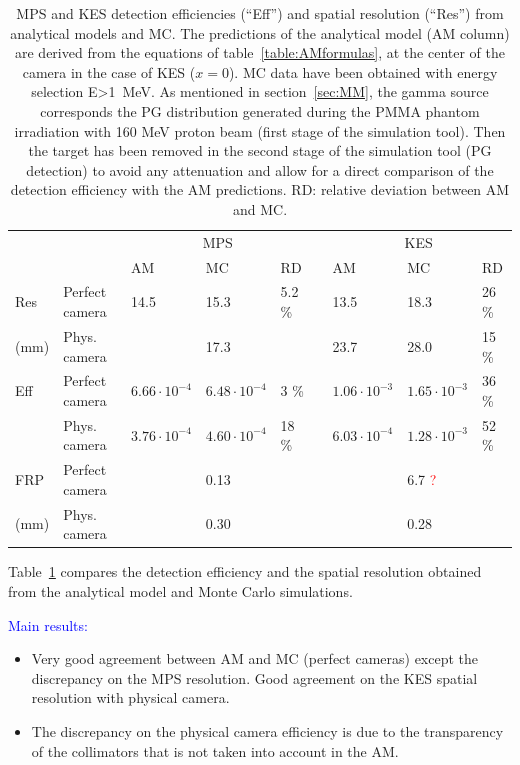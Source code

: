 \documentclass[a4paper,english,12pt]{article}
\newcommand{\qq}[1]{\enquote{#1}}
\newcommand{\bh}[2][red]{\textcolor{#1}{#2}}
\newcommand{\et}[2][blue]{\textcolor{#1}{#2}}
\begin{document}
\begin{table}[h]
\centering
\begin{tabular}{lllllllll}
	\midrule
	\multicolumn{2}{c}{}				& \multicolumn{3}{c}{MPS}																	&& \multicolumn{3}{c}{KES}										\\
	\cline{3-5}\cline{7-9}
	\multicolumn{2}{c}{}				& AM 										& MC 									& RD	 			&& AM 										& MC & RD							\\
	\midrule
	Res	& Perfect camera				& 14.5 								& 15.3  	 			& 5.2 \%	&& 13.5 								& 18.3 				& 26 \%  \\
	(mm)	& Phys. camera					& 					& 17.3  	 					&						&& 23.7									& 28.0 									& 15 \% \\

	\midrule
	Eff    & Perfect camera			&  $6.66 \cdot 10^{-4}$ & $6.48\cdot10^{-4}$	&	3 \%					&& $1.06 \cdot 10^{-3}$  & $1.65\cdot10^{-3}$			& 36 \%\\
	       & Phys. camera				&  $3.76 \cdot 10^{-4}$	& $4.60\cdot10^{-4}$	&	18 \%					&& $6.03 \cdot 10^{-4}$	& $1.28\cdot10^{-3}$	& 52 \%\\
 	\midrule
	FRP    & Perfect camera			&  & 0.13 	&  &&  & 6.7 	\bh{?}		& \\
	(mm)       & Phys. camera				&  & 0.30 	&  && 	& 0.28 	& \\
 	\midrule
\end{tabular}
\caption{MPS and KES detection efficiencies (\qq{Eff}) and spatial resolution (\qq{Res}) from analytical models and MC. The predictions of the analytical model (AM column) are derived from the equations of table~\ref{table:AMformulas}, at the center of the camera in the case of KES ($x=0$). MC data have been obtained with energy selection E>1~MeV. As mentioned in section~\ref{sec:MM}, the gamma source corresponds the PG distribution generated during the PMMA phantom irradiation with 160 MeV proton beam (first stage of the simulation tool). Then the target has been removed in the second stage of the simulation tool (PG detection) to avoid any attenuation and allow for a direct comparison of the detection efficiency with the AM predictions. RD: relative deviation between AM and MC.}
\label{tab:AMV}
\end{table}

Table~\ref{tab:AMV} compares the detection efficiency and the spatial resolution obtained from the analytical model and Monte Carlo simulations. 

\et{Main results:}
\begin{itemize}
	\item Very good agreement between AM and MC (perfect cameras) except the discrepancy on the MPS resolution. Good agreement on the KES spatial resolution with physical camera.
	\item The discrepancy on the physical camera efficiency is due to the transparency of the collimators that is not taken into account in the AM.
\end{itemize}
\end{document}
